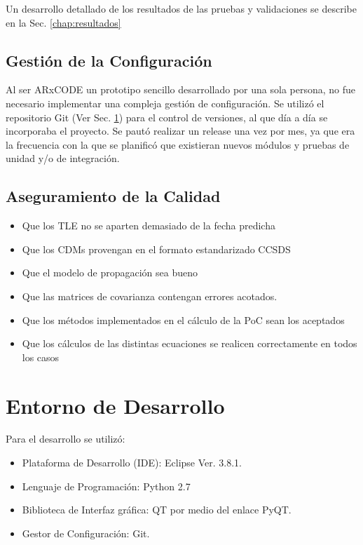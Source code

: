 Un desarrollo detallado de los resultados de las pruebas y validaciones se describe en la Sec. \ref{chap:resultados}\\

\subsection{Gesti\'on de la Configuraci\'on}

Al ser ARxCODE un prototipo sencillo desarrollado por una sola persona, no fue necesario implementar una compleja gesti\'on de configuraci\'on. Se utiliz\'o el repositorio Git (Ver Sec. \ref{sec:entorno}) para el control de versiones, al que d\'ia a d\'ia se incorporaba el proyecto. Se paut\'o realizar un release una vez por mes, ya que era la frecuencia con la que se planific\'o que existieran nuevos m\'odulos y pruebas de unidad y/o de integraci\'on. 


\subsection{Aseguramiento de la Calidad}

\begin{itemize}
 \item Que los TLE no se aparten demasiado de la fecha predicha
 \item Que los CDMs provengan en el formato estandarizado CCSDS
 \item Que el modelo de propagaci\'on sea bueno
 \item Que las matrices de covarianza contengan errores acotados. 
 \item Que los m\'etodos implementados en el c\'alculo de la PoC sean los aceptados
 \item Que los c\'alculos de las distintas ecuaciones se realicen correctamente en todos los casos
\end{itemize}



\section{Entorno de Desarrollo}\label{sec:entorno}

Para el desarrollo se utiliz\'o:\\
\begin{itemize}
 \item Plataforma de Desarrollo (\ac{IDE}): Eclipse Ver. 3.8.1.
 \item Lenguaje de Programaci\'on: Python 2.7
 \item Biblioteca de Interfaz gr\'afica: QT por medio del enlace PyQT.
 \item Gestor de Configuraci\'on: Git.
\end{itemize}

